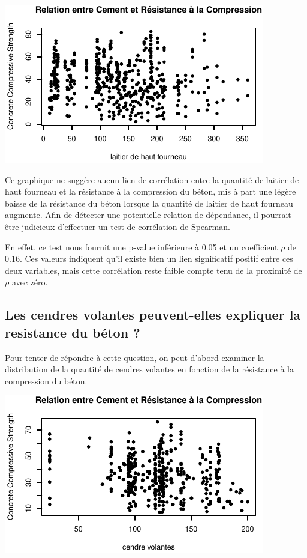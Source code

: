 \documentclass[
  12pt,
]{article}
\begin{document}
\begin{center}\includegraphics{rmd_final_files/figure-latex/unnamed-chunk-13-1} \end{center}

Ce graphique ne suggère aucun lien de corrélation entre la quantité de
laitier de haut fourneau et la résistance à la compression du béton, mis
à part une légère baisse de la résistance du béton lorsque la quantité
de laitier de haut fourneau augmente. Afin de détecter une potentielle
relation de dépendance, il pourrait être judicieux d'effectuer un test
de corrélation de Spearman.

En effet, ce test nous fournit une p-value inférieure à 0.05 et un
coefficient \(\rho\) de 0.16. Ces valeurs indiquent qu'il existe bien un
lien significatif positif entre ces deux variables, mais cette
corrélation reste faible compte tenu de la proximité de \(\rho\) avec
zéro.

\subsection{Les cendres volantes peuvent-elles expliquer la resistance
du béton
?}\label{les-cendres-volantes-peuvent-elles-expliquer-la-resistance-du-buxe9ton}

Pour tenter de répondre à cette question, on peut d'abord examiner la
distribution de la quantité de cendres volantes en fonction de la
résistance à la compression du béton.

\begin{center}\includegraphics{rmd_final_files/figure-latex/unnamed-chunk-15-1} \end{center}
\end{document}
